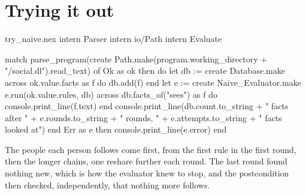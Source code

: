 \section{Trying it out}

\begin{tryit}{try_naive.nex}
intern Parser
intern io/Path
intern Evaluate

match parse_program(create Path.make(program.working_directory + "/social.dl").read_text) of
  Ok as ok then
    do
      let db := create Database.make
      across ok.value.facts as f do
        db.add(f)
      end
      let e := create Naive_Evaluator.make
      e.run(ok.value.rules, db)
      across db.facts_of("sees") as f do
        console.print_line(f.text)
      end
      console.print_line(db.count.to_string + " facts after " + e.rounds.to_string
        + " rounds, " + e.attempts.to_string + " facts looked at")
    end
  Err as e then console.print_line(e.error)
end
\end{tryit}

The people each person follows come first, from the first rule in the
first round, then the longer chains, one reshare further each round. The last round
found nothing new, which is how the evaluator knew to stop, and the
postcondition then checked, independently, that nothing more follows.
